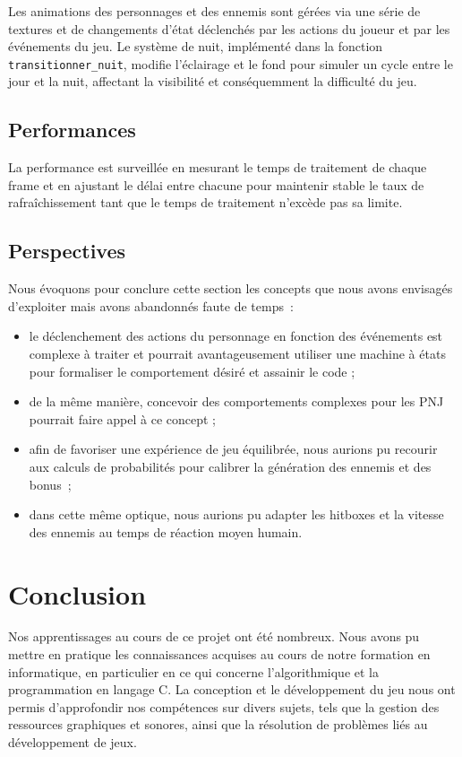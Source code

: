 \documentclass[a4paper,12pt]{article}
\begin{document}
Les animations des personnages et des ennemis sont gérées via une série de textures et de changements d'état déclenchés par les actions du joueur et par les événements du jeu. Le système de nuit, implémenté dans la fonction \texttt{transitionner\_nuit}, modifie l'éclairage et le fond pour simuler un cycle entre le jour et la nuit, affectant la visibilité et conséquemment la difficulté du jeu.

\subsection{Performances}

La performance est surveillée en mesurant le temps de traitement de chaque frame et en ajustant le délai entre chacune pour maintenir stable le taux de rafraîchissement tant que le temps de traitement n’excède pas sa limite.

\subsection{Perspectives}

Nous évoquons pour conclure cette section les concepts que nous avons envisagés d’exploiter mais avons abandonnés faute de temps :
\begin{itemize}
    \item le déclenchement des actions du personnage en fonction des événements est complexe à traiter et pourrait avantageusement utiliser une machine à états pour formaliser le comportement désiré et assainir le code ;
    \item de la même manière, concevoir des comportements complexes pour les PNJ pourrait faire appel à ce concept ;
    \item afin de favoriser une expérience de jeu équilibrée, nous aurions pu recourir aux calculs de probabilités pour calibrer la génération des ennemis et des bonus ;
    \item dans cette même optique, nous aurions pu adapter les hitboxes et la vitesse des ennemis au temps de réaction moyen humain.
\end{itemize}

\section{Conclusion}

Nos apprentissages au cours de ce projet ont été nombreux. Nous avons pu mettre en pratique les connaissances acquises au cours de notre formation en informatique, en particulier en ce qui concerne l’algorithmique et la programmation en langage C. 
La conception et le développement du jeu nous ont permis d’approfondir nos compétences sur divers sujets, tels que la gestion des ressources graphiques et sonores, ainsi que la résolution de problèmes liés au développement de jeux.
\end{document}

